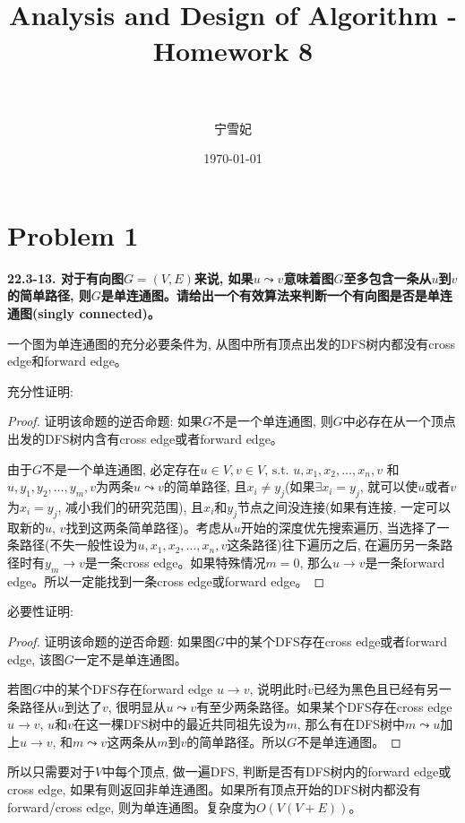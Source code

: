 \documentclass[paper=a4, fontsize=11pt]{scrartcl} %
\title{	
\normalfont \normalsize 
\horrule{0.5pt} \\[0.4cm] %
\huge Analysis and Design of Algorithm - Homework 8\\ %
\horrule{2pt} \\[0.5cm] %
}
\author{宁雪妃} %
\date{\normalsize\today} %
\numberwithin{equation}{section} %
\numberwithin{figure}{section} %
\numberwithin{table}{section} %
\begin{document}
\maketitle %

\section{Problem 1}
\textbf{22.3-13. 对于有向图$G = (V, E)$来说, 如果$u \leadsto v$意味着图$G$至多包含一条从$u$到$v$的简单路径, 则$G$是单连通图。请给出一个有效算法来判断一个有向图是否是单连通图(singly connected)。}

一个图为单连通图的充分必要条件为, 从图中所有顶点出发的DFS树内都没有cross edge和forward edge。

充分性证明:
\begin{proof}
  证明该命题的逆否命题: 如果$G$不是一个单连通图, 则$G$中必存在从一个顶点出发的DFS树内含有cross edge或者forward edge。

  由于$G$不是一个单连通图, 必定存在$u \in V, v \in V$, $\mbox{s.t. } u, x_1, x_2, \dots, x_n, v$ 和 $u, y_1, y_2, \dots, y_m, v$为两条$u \leadsto v$的简单路径, 且$x_i \neq y_j$(如果$\exists x_i = y_j$, 就可以使$u$或者$v$为$x_i = y_j$, 减小我们的研究范围), 且$x_i$和$y_j$节点之间没连接(如果有连接, 一定可以取新的$u$, $v$找到这两条简单路径)。考虑从$u$开始的深度优先搜索遍历, 当选择了一条路径(不失一般性设为$u, x_1, x_2, \dots, x_n, v$这条路径)往下遍历之后, 在遍历另一条路径时有$y_m \rightarrow v$是一条cross edge。如果特殊情况$m = 0$, 那么$u \rightarrow v$是一条forward edge。所以一定能找到一条cross edge或forward edge。
\end{proof}

必要性证明:
\begin{proof}
  证明该命题的逆否命题: 如果图$G$中的某个DFS存在cross edge或者forward edge, 该图$G$一定不是单连通图。

  若图$G$中的某个DFS存在forward edge $u \rightarrow v$, 说明此时$v$已经为黑色且已经有另一条路径从$u$到达了$v$, 很明显从$u \leadsto v$有至少两条路径。如果某个DFS存在cross edge $u \rightarrow v$, $u$和$v$在这一棵DFS树中的最近共同祖先设为$m$, 那么有在DFS树中$m \leadsto u$加上$u \rightarrow v$, 和$m \leadsto v$这两条从$m$到$v$的简单路径。所以$G$不是单连通图。
\end{proof}

所以只需要对于$V$中每个顶点, 做一遍DFS, 判断是否有DFS树内的forward edge或cross edge, 如果有则返回非单连通图。如果所有顶点开始的DFS树内都没有forward/cross edge, 则为单连通图。复杂度为$O(V (V+E))$。
\\[2ex]
\end{document}
